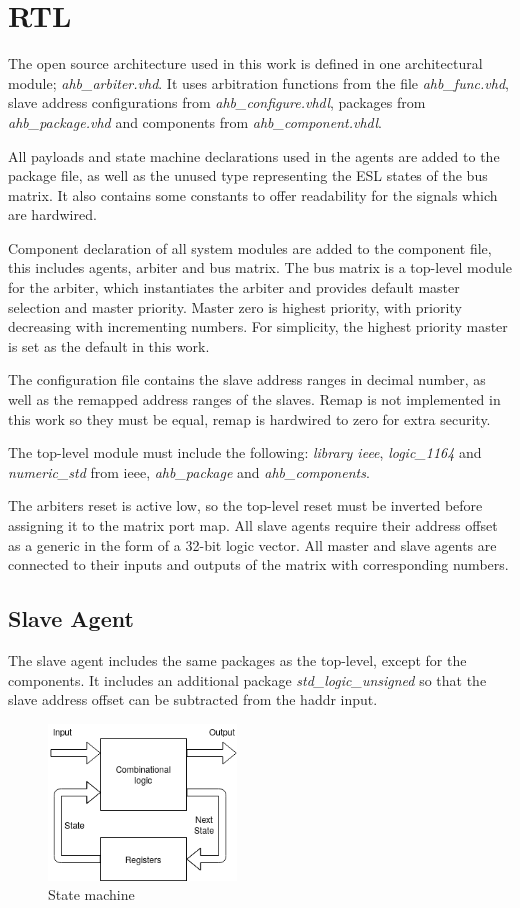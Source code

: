\section{RTL}
The open source architecture used in this work is defined in one architectural module; \textit{ahb\_arbiter.vhd}. It uses arbitration functions from the file \textit{ahb\_func.vhd}, slave address configurations from \textit{ahb\_configure.vhdl}, packages from \textit{ahb\_package.vhd} and components from \textit{ahb\_component.vhdl}. \par
All payloads and state machine declarations used in the agents are added to the package file, as well as the unused type representing the ESL states of the bus matrix. It also contains some constants to offer readability for the signals which are hardwired. \par
Component declaration of all system modules are added to the component file, this includes agents, arbiter and bus matrix. The bus matrix is a top-level module for the arbiter, which instantiates the arbiter and provides default master selection and master priority. Master zero is highest priority, with priority decreasing with incrementing numbers. For simplicity, the highest priority master is set as the default in this work. \par
The configuration file contains the slave address ranges in decimal number, as well as the remapped address ranges of the slaves. Remap is not implemented in this work so they must be equal, remap is hardwired to zero for extra security. \par
The top-level module must include the following: \textit{library ieee}, \textit{logic\_1164} and \textit{numeric\_std} from ieee, \textit{ahb\_package} and \textit{ahb\_components}. \par
The arbiters reset is active low, so the top-level reset must be inverted before assigning it to the matrix port map. All slave agents require their address offset as a generic in the form of a 32-bit logic vector. All master and slave agents are connected to their inputs and outputs of the matrix with corresponding numbers. 

\subsection{Slave Agent}
The slave agent includes the same packages as the top-level, except for the components. It includes an additional package \textit{std\_logic\_unsigned} so that the slave address offset can be subtracted from the haddr input. \par
\begin{figure}
\includegraphics[width=5cm]{figs/hw/statemachine.png}
\caption{State machine}\label{fig:statem}
\end{figure} 

